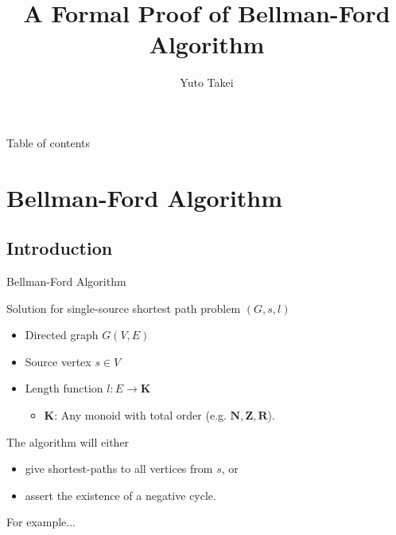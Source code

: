 \documentclass{beamer}
\begin{document}
\title{A Formal Proof of Bellman-Ford Algorithm}
\author[Yuto Takei]{Yuto Takei}

\maketitle

\begin{frame}{Table of contents}
\tableofcontents
\end{frame}

\section{Bellman-Ford Algorithm}
\frame{\sectionpage}

\subsection{Introduction}

\begin{frame}{Bellman-Ford Algorithm}

Solution for single-source shortest path problem $(G,s,l)$

\begin{itemize}
\item Directed graph $G(V,E)$
\item Source vertex $s\in V$
\item Length function $l: E\to \mathbf{K}$
\begin{itemize}
\item $\mathbf{K}$: Any monoid with total order (e.g. 
$\mathbf{N}, \mathbf{Z}, \mathbf{R}$).
\end{itemize}
\end{itemize}

\pause

The algorithm will either

\begin{itemize}
\item give shortest-paths to all vertices from $s$, or
\item assert the existence of a negative cycle.
\end{itemize}

\end{frame}

\begin{frame}{For example...}


\begin{itemize} 
\end{itemize}

\end{frame}
\end{document}
